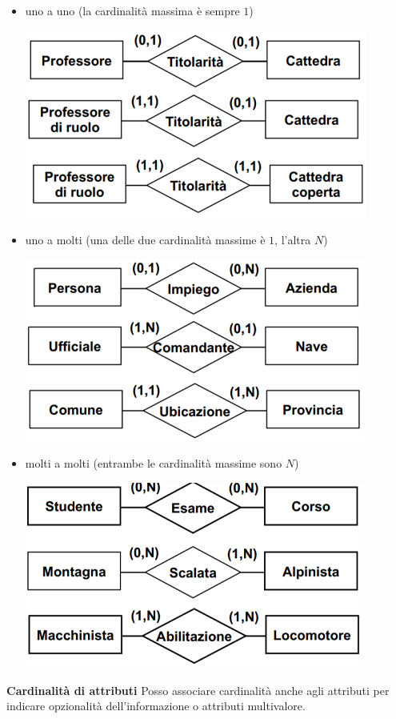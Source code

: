 \begin{itemize}
	\item uno a uno (la cardinalità massima è sempre $1$)
	\begin{center}\includegraphics{images/149.PNG}\end{center}
	\item uno a molti (una delle due cardinalità massime è $1$, l'altra $N$)
	\begin{center}\includegraphics{images/147.PNG}\end{center}
	\item molti a molti (entrambe le cardinalità massime sono $N$)
	\begin{center}\includegraphics{images/148.PNG}\end{center}
\end{itemize}
\textbf{Cardinalità di attributi} Posso associare cardinalità anche agli attributi per indicare opzionalità dell'informazione o attributi multivalore.
\clearpage
